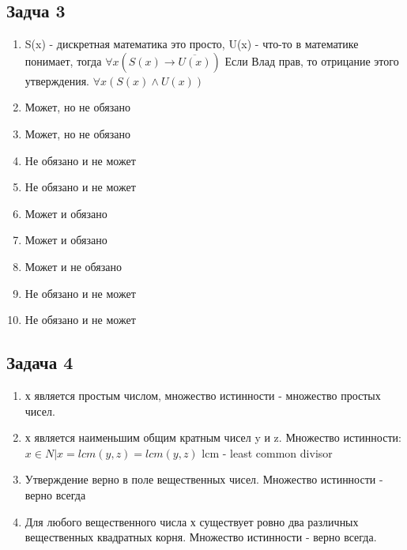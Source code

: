 \documentclass[a4paper,12pt]{article}
\begin{document}
\subsection{Задча 3}
\begin{enumerate}
    \item S(x) - дискретная математика это просто, U(x) - что-то в математике понимает, тогда $\forall x(S(x) \to \overline{U(x)})$ Если Влад прав, то отрицание этого утверждения. $\forall x(S(x) \land U(x))$
    \item Может, но не обязано
    \item Может, но не обязано
    \item Не обязано и не может
    \item Не обязано и не может
    \item Может и обязано
    \item Может и обязано
    \item Может и не обязано
    \item Не обязано и не может
    \item Не обязано и не может
\end{enumerate}

\subsection{Задача 4}
\begin{enumerate}
    \item х является простым числом, множество истинности - множество простых чисел.
    \item х является наименьшим общим кратным чисел y и z. Множество истинности: ${x \in N| x = lcm(y, z)}={lcm(y, z)}$ lcm - least common divisor
    \item Утверждение верно в поле вещественных чисел. Множество истинности - верно всегда
    \item Для любого вещественного числа х существует ровно два различных вещественных квадратных корня. Множество истинности - верно всегда.
\end{enumerate}
\end{document}
